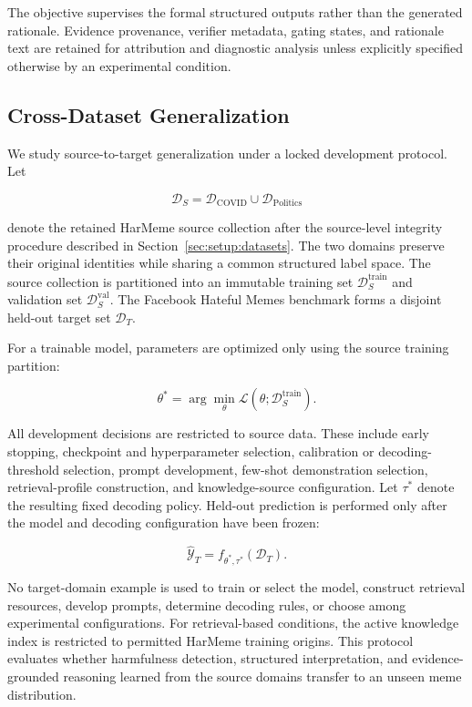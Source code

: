 The objective supervises the formal structured outputs rather than
the generated rationale.
Evidence provenance, verifier metadata, gating states, and rationale
text are retained for attribution and diagnostic analysis unless
explicitly specified otherwise by an experimental condition.

\subsection{Cross-Dataset Generalization}
\label{sec:problem:generalization}

We study source-to-target generalization under a locked
development protocol.
Let

\begin{equation}
\mathcal{D}_{S}
=
\mathcal{D}_{\mathrm{COVID}}
\cup
\mathcal{D}_{\mathrm{Politics}}
\end{equation}

denote the retained HarMeme source collection after the source-level
integrity procedure described in
Section~\ref{sec:setup:datasets}.
The two domains preserve their original identities while sharing a
common structured label space.
The source collection is partitioned into an immutable training set
$\mathcal{D}_{S}^{\mathrm{train}}$ and validation set
$\mathcal{D}_{S}^{\mathrm{val}}$.
The Facebook Hateful Memes benchmark forms a disjoint held-out
target set $\mathcal{D}_{T}$.

For a trainable model, parameters are optimized only using the
source training partition:

\begin{equation}
\theta^{*}
=
\arg\min_{\theta}
\mathcal{L}
\left(
\theta;
\mathcal{D}_{S}^{\mathrm{train}}
\right).
\label{eq:source_training}
\end{equation}

All development decisions are restricted to source data.
These include early stopping, checkpoint and hyperparameter
selection, calibration or decoding-threshold selection, prompt
development, few-shot demonstration selection, retrieval-profile
construction, and knowledge-source configuration.
Let $\tau^{*}$ denote the resulting fixed decoding policy.
Held-out prediction is performed only after the model and decoding
configuration have been frozen:

\begin{equation}
\hat{\mathcal{Y}}_{T}
=
f_{\theta^{*},\tau^{*}}
\left(
\mathcal{D}_{T}
\right).
\label{eq:heldout_evaluation}
\end{equation}

No target-domain example is used to train or select the model,
construct retrieval resources, develop prompts, determine decoding
rules, or choose among experimental configurations.
For retrieval-based conditions, the active knowledge index is
restricted to permitted HarMeme training origins.
This protocol evaluates whether harmfulness detection, structured
interpretation, and evidence-grounded reasoning learned from the
source domains transfer to an unseen meme distribution.
